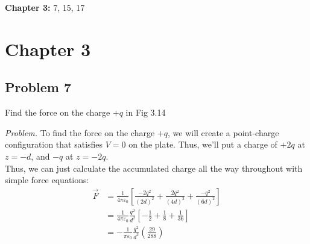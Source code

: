 \documentclass[10pt,oneside]{book}
\newcommand{\gspc}{\vspace{0.13cm}} %
\newcommand{\gline}[0]{\gspc\\} %
\newenvironment{problem}[1]
  {\vspace{-0.1cm}\begin{tcolorbox}[problembox]
   \textit{Problem. }#1}
  {\end{tcolorbox}\gspc}
\newcommand{\cpr}[1]{\left(#1\right)}
\begin{document}
\newcommand{\vE}{{\mathbf{E}}}
\newcommand{\vr}{{\mathbf{r}}}
\newcommand{\fpie}{\frac{1}{4\pi\varepsilon_0}}

\textbf{Chapter 3: }7, 15, 17

\section*{Chapter 3}
\subsection*{Problem 7}
Find the force on the charge $+q$ in Fig 3.14
\begin{problem}
  To find the force on the charge $+q$, we will create a point-charge configuration that satisfies $V = 0$ on the plate. Thus, we'll put a charge of $+2q$ at $z = -d$, and $-q$ at $z = -2q$.\gline{}
  Thus, we can just calculate the accumulated charge all the way throughout with simple force equations:
  \begin{align*}
    \vec F &= \fpie\left[\frac{-2q^2}{(2d)^2}+\frac{2q^2}{(4d)^2}+\frac{-q^2}{(6d)^2}\right]\\
    &= \fpie \frac{q^2}{d^2} \left[-\frac{1}2+\frac{1}8+\frac{1}{36}\right]\\
    &= -\frac{1}{\pi\varepsilon_0}\frac{q^2}{d^2}\cpr{\frac{29}{288}}
  \end{align*}
\end{problem}
\end{document}
